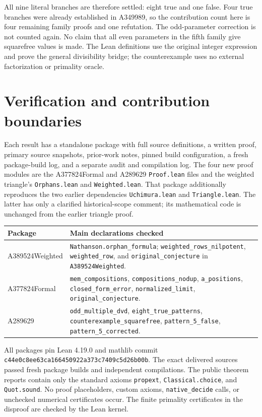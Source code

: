 \documentclass[11pt]{article}
\begin{document}
All nine literal branches are therefore settled: eight true and one
false. Four true branches were already established in A349989, so the
contribution count here is four remaining family proofs and one
refutation. The odd-parameter correction is not counted again. No claim
that all even parameters in the fifth family give squarefree values is
made. The Lean definitions use the original integer expression and
prove the general divisibility bridge; the counterexample uses no
external factorization or primality oracle.

\section{Verification and contribution boundaries}

Each result has a standalone package with full source definitions, a
written proof, primary source snapshots, prior-work notes, pinned build
configuration, a fresh package-build log, and a separate audit and
compilation log. The four new proof modules are the A377824Formal and A289629
\texttt{Proof.lean} files and the weighted triangle's \texttt{Orphans.lean}
and \texttt{Weighted.lean}. That package additionally reproduces the two
earlier dependencies \texttt{Uchimura.lean} and \texttt{Triangle.lean}.
The latter has only a clarified historical-scope comment; its mathematical
code is unchanged from the earlier triangle proof.

\begin{center}
\begin{tabular}{@{}l>{\raggedright\arraybackslash}p{4.6in}@{}}
\toprule
Package & Main declarations checked\\
\midrule
A389524Weighted & \texttt{Nathanson.orphan\_formula};
\texttt{weighted\_rows\_nilpotent}, \texttt{weighted\_row}, and
\texttt{original\_conjecture} in \texttt{A389524Weighted}.\\
A377824Formal & \texttt{mem\_compositions}, \texttt{compositions\_nodup},
\texttt{a\_positions}, \texttt{closed\_form\_error},
\texttt{normalized\_limit}, \texttt{original\_conjecture}.\\
A289629 & \texttt{odd\_multiple\_dvd}, \texttt{eight\_true\_patterns},
\texttt{counterexample\_squarefree}, \texttt{pattern\_5\_false},
\texttt{pattern\_5\_corrected}.\\
\bottomrule
\end{tabular}
\end{center}

All packages pin Lean 4.19.0 and mathlib commit
\texttt{c44e0c8ee63ca166450922a373c7409c5d26b00b}.
The exact delivered sources passed fresh package builds and independent
compilations. The public theorem reports contain only the standard axioms
\texttt{propext}, \texttt{Classical.choice}, and \texttt{Quot.sound}.
No proof placeholders, custom axioms, \texttt{native\_decide} calls,
or unchecked numerical certificates occur. The finite primality
certificates in the disproof are checked by the Lean kernel.
\end{document}
